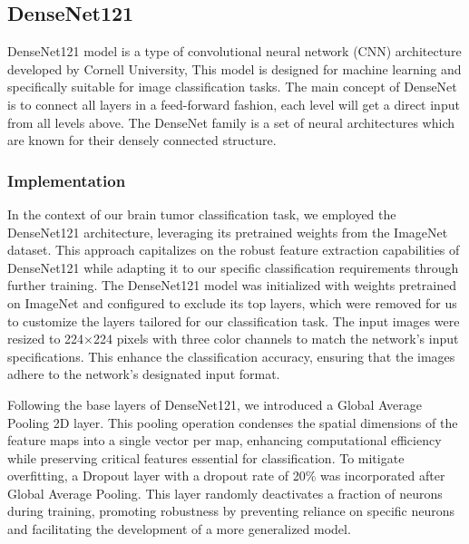 \subsection{DenseNet121}\label{s:densenet121}

DenseNet121 model is a type of convolutional neural network (CNN)\cite{Utaminingrum_Metrics_2021} architecture developed by Cornell University, This model is designed for machine learning and specifically suitable for image classification tasks. The main concept of DenseNet is to connect all layers in a feed-forward fashion, each level will get a direct input from all levels above. The DenseNet family is a set of neural architectures which are known for their densely connected structure.

\subsubsection{Implementation}

In the context of our brain tumor classification task, we employed the DenseNet121 architecture, leveraging its pretrained weights from the ImageNet dataset. This approach capitalizes on the robust feature extraction capabilities of DenseNet121 while adapting it to our specific classification requirements through further training. The DenseNet121 model was initialized with weights pretrained on ImageNet and configured to exclude its top layers, which were removed for us to customize the layers tailored for our classification task. The input images were resized to 224×224 pixels with three color channels\cite{Utaminingrum_Metrics_2021} to match the network's input specifications. This enhance the classification accuracy, ensuring that the images adhere to the network's designated input format.

Following the base layers of DenseNet121, we introduced a Global Average Pooling 2D layer. This pooling operation condenses the spatial dimensions of the feature maps into a single vector per map, enhancing computational efficiency while preserving critical features essential for classification. To mitigate overfitting, a Dropout layer with a dropout rate of 20\% was incorporated after Global Average Pooling. This layer randomly deactivates a fraction of neurons during training, promoting robustness by preventing reliance on specific neurons and facilitating the development of a more generalized model.

